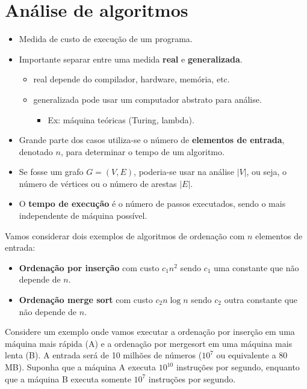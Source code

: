 \section{Análise de algoritmos}

\begin{itemize}
\item Medida de custo de execução de um programa.
\item Importante separar entre uma medida {\bf real}  e {\bf generalizada}.
	\begin{itemize}
	\item real depende do compilador, hardware, memória, etc.
	\item generalizada pode usar um computador abstrato para análise.
		\begin{itemize}
		\item Ex: máquina teóricas (Turing, lambda).
		\end{itemize}
	\end{itemize}
\item Grande parte dos casos utiliza-se o número de {\bf elementos de entrada}, denotado $n$, para
determinar o tempo de um algoritmo.
\item Se fosse um grafo $G = (V, E)$, poderia-se usar na análise $|V|$, ou seja, o número de vértices ou
o número de arestas $|E|$.
\item O {\bf tempo de execução} é o número de passos executados, sendo o mais independente de 
máquina possível.
\end{itemize}

Vamos considerar dois exemplos de algoritmos de ordenação com $n$ elementos de entrada:
\begin{itemize}
\item {\bf Ordenação por inserção} com custo $c_1 n^2$ sendo $c_1$ uma constante que não depende de $n$.
\item {\bf Ordenação merge sort} com custo $c_2 n \log n$ sendo $c_2$ outra constante que não depende de $n$.
\end{itemize}

Considere um exemplo onde vamos executar a ordenação por inserção em uma
máquina mais rápida (A) e a ordenação por mergesort em uma máquina mais lenta
(B).
A entrada será de 10 milhões de números ($10^7$ ou equivalente a $80$ MB).
Suponha que a máquina A executa $10^{10}$ instruções por segundo, enquanto que a máquina B executa
somente $10^7$ instruções por segundo. 

